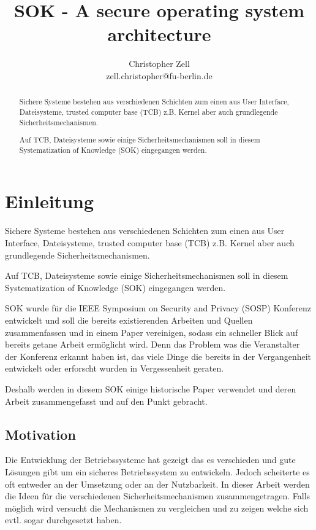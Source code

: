 \documentclass[9pt,technote]{IEEEtran}
\title{SOK - A secure operating system architecture}
\author{Christopher Zell\\
        zell.christopher@fu-berlin.de}
\begin{document}
\maketitle

  \begin{abstract}
    Sichere Systeme bestehen aus verschiedenen Schichten zum einen aus
    User Interface, Dateisysteme, trusted computer base (TCB) z.B. Kernel aber auch
    grundlegende Sicherheitsmechanismen.
    
    Auf TCB, Dateisysteme sowie einige Sicherheitsmechanismen soll in diesem
    Systematization of Knowledge (SOK) eingegangen werden.
    
  \end{abstract}
  
  \section{Einleitung} \label{sec:intro}
    Sichere Systeme bestehen aus verschiedenen Schichten zum einen aus
    User Interface, Dateisysteme, trusted computer base (TCB) z.B. Kernel aber auch
    grundlegende Sicherheitsmechanismen.
    
    Auf TCB, Dateisysteme sowie einige Sicherheitsmechanismen soll in diesem
    Systematization of Knowledge (SOK) eingegangen werden.
    
    SOK wurde f\"ur die IEEE Symposium on Security and Privacy (SOSP) Konferenz
    entwickelt und soll die bereits existierenden Arbeiten und Quellen zusammenfassen
    und in einem Paper vereinigen, sodass ein schneller Blick auf bereits getane
    Arbeit erm\"oglicht wird. Denn das Problem was die Veranstalter der Konferenz
    erkannt haben ist, das viele Dinge die bereits in der Vergangenheit entwickelt oder
    erforscht wurden in Vergessenheit geraten.
    
    Deshalb werden in diesem SOK einige historische Paper verwendet und deren Arbeit
    zusammengefasst und auf den Punkt gebracht.
    
    \subsection{Motivation}
      Die Entwicklung der Betriebssysteme hat gezeigt das es verschieden und gute L\"osungen gibt um ein sicheres Betriebssystem zu entwickeln.
      Jedoch scheiterte es oft entweder an der Umsetzung oder an der Nutzbarkeit. 
      In dieser Arbeit werden die Ideen f\"ur die verschiedenen Sicherheitsmechanismen zusammengetragen.
      Falls m\"oglich wird versucht die Mechanismen zu vergleichen und zu zeigen welche sich evtl. sogar durchgesetzt haben.
\end{document}
